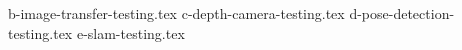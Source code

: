 \section{
  }

\label{sec:experiments}


{b-image-transfer-testing.tex}
{c-depth-camera-testing.tex}
{d-pose-detection-testing.tex}
{e-slam-testing.tex}
